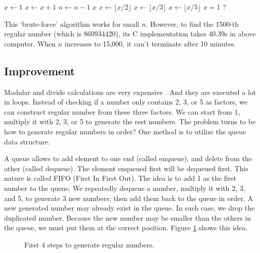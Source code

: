 \documentclass[b5paper]{article}
\begin{document}
\begin{algorithmic}[1]
  \State $x \gets 1$
    \State $x \gets x + 1$
      \State $n \gets n - 1$
    \EndIf
  \EndWhile
  \State \Return $x$
\EndFunction
\Statex
{}
    \State $x \gets \lfloor x / 2 \rfloor$
  \EndWhile
    \State $x \gets \lfloor x / 3 \rfloor$
  \EndWhile
    \State $x \gets \lfloor x / 5 \rfloor$
  \EndWhile
  \State \Return $x = 1$ ?
\EndFunction
\end{algorithmic}

This `brute-force' algorithm works for small $n$. However, to find the 1500-th regular number (which is 860934420), its C implementation takes 40.39s in above computer. When $n$ increases to 15,000, it can't terminate after 10 minutes.

\subsection{Improvement}
Modular and divide calculations are very expensive \cite{Bentley}. And they are executed a lot in loops. Instead of checking if a number only contains 2, 3, or 5 as factors, we can construct regular number from these three factors. We can start from 1, multiply it with 2, 3, or 5 to generate the rest numbers. The problem turns to be how to generate regular numbers in order? One method is to utilize the queue data structure.

A queue allows to add element to one end (called enqueue), and delete from the other (called dequeue). The element enqueued first will be dequeued first. This nature is called FIFO (First In First Out). The idea is to add 1 as the first number to the queue. We repeatedly dequeue a number, multiply it with 2, 3, and 5, to generate 3 new numbers; then add them back to the queue in order. A new generated number may already exist in the queue. In such case, we drop the duplicated number. Because the new number may be smaller than the others in the queue, we must put them at the correct position. Figure \ref{fig:queues} shows this idea.

\begin{figure}[htbp]
  \centering
  \caption{First 4 steps to generate regular numbers.}
  \label{fig:queues}
\end{figure}
\end{document}
